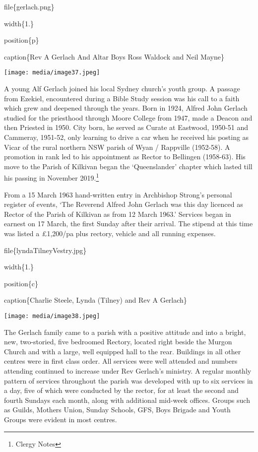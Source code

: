 file\{gerlach.png\}

width\{1.\}

position\{p\}

caption\{Rev A Gerlach And Altar Boys Ross Waldock and Neil Mayne\}

\texttt{[image: media/image37.jpeg]}

A young Alf Gerlach joined his local Sydney church's youth group. A passage from Ezekiel, encountered during a Bible Study session was his call to a faith which grew and deepened through the years. Born in 1924, Alfred John Gerlach studied for the priesthood through Moore College from 1947, made a Deacon and then Priested in 1950. City born, he served as Curate at Eastwood, 1950-51 and Cammeray, 1951-52, only learning to drive a car when he received his posting as Vicar of the rural northern NSW parish of Wyan / Rappville (1952-58). A promotion in rank led to his appointment as Rector to Bellingen (1958-63). His move to the Parish of Kilkivan began the `Queenslander' chapter which lasted till his passing in November 2019.\footnote{Clergy Notes}

From a 15 March 1963 hand-written entry in Archbishop Strong's personal register of events, `The Reverend Alfred John Gerlach was this day licenced as Rector of the Parish of Kilkivan as from 12 March 1963.' Services began in earnest on 17 March, the first Sunday after their arrival. The stipend at this time was listed a £1,200/pa plus rectory, vehicle and all running expenses.

file\{lyndaTilneyVestry.jpg\}

width\{1.\}

position\{c\}

caption\{Charlie Steele, Lynda (Tilney) and Rev A Gerlach\}

\texttt{[image: media/image38.jpeg]}

The Gerlach family came to a parish with a positive attitude and into a bright, new, two-storied, five bedroomed Rectory, located right beside the Murgon Church and with a large, well equipped hall to the rear. Buildings in all other centres were in first class order. All services were well attended and numbers attending continued to increase under Rev Gerlach's ministry. A regular monthly pattern of services throughout the parish was developed with up to six services in a day, five of which were conducted by the rector, for at least the second and fourth Sundays each month, along with additional mid-week offices. Groups such as Guilds, Mothers Union, Sunday Schools, GFS, Boys Brigade and Youth Groups were evident in most centres.

